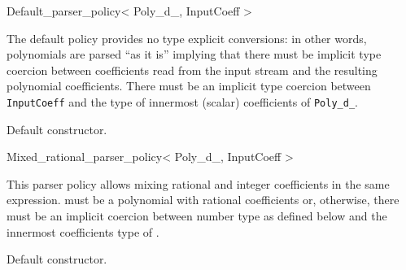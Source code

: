 \begin{ccRefClass} {Default_parser_policy< Poly_d_, InputCoeff >}

\ccDefinition
The default policy provides no type explicit conversions: in other words, polynomials are parsed ``as it is'' implying that there must be implicit type coercion between coefficients read from the input stream and the resulting polynomial coefficients. There must be an implicit type coercion between {\tt InputCoeff} and the type of innermost (scalar) coefficients of {\tt Poly\_d\_}.


\ccIsModel
{}

\ccTypes

\ccGlue
{}\ccGlue


\ccCreation
{}

{Default constructor.}


\end{ccRefClass}

\begin{ccRefClass} {Mixed_rational_parser_policy< Poly_d_, InputCoeff >}

\ccDefinition
This parser policy allows mixing rational and integer coefficients in the same expression.  must be a polynomial with rational coefficients or, otherwise, there must be an implicit coercion between  number type as defined below and
the innermost coefficients type of . 


\ccIsModel
{}

\ccInheritsFrom
{}

\ccTypes

\ccGlue
{}\ccGlue
{}\ccGlue
{}\ccGlue


\ccCreation
{}

{Default constructor.}



\end{ccRefClass}

